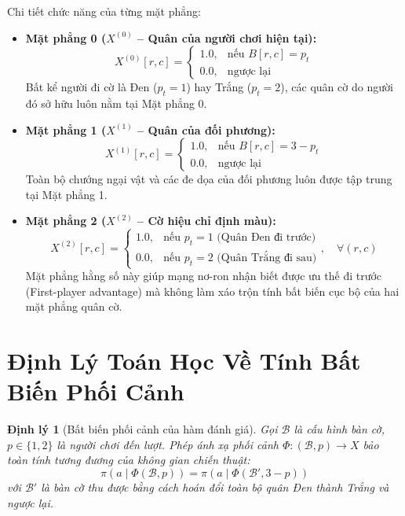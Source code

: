 \documentclass[11pt,a4paper]{report}
\newtheorem{theorem}{Định lý}[chapter]
\begin{document}
Chi tiết chức năng của từng mặt phẳng:
\begin{itemize}
    \item \textbf{Mặt phẳng 0 ($X^{(0)}$ -- Quân của người chơi hiện tại):}
    \begin{equation}
        X^{(0)}[r, c] = \begin{cases} 1.0, & \text{nếu } B[r, c] = p_t \\ 0.0, & \text{ngược lại} \end{cases}
    \end{equation}
    Bất kể người đi cờ là Đen ($p_t = 1$) hay Trắng ($p_t = 2$), các quân cờ do người đó sở hữu luôn nằm tại Mặt phẳng 0.
    \item \textbf{Mặt phẳng 1 ($X^{(1)}$ -- Quân của đối phương):}
    \begin{equation}
        X^{(1)}[r, c] = \begin{cases} 1.0, & \text{nếu } B[r, c] = 3 - p_t \\ 0.0, & \text{ngược lại} \end{cases}
    \end{equation}
    Toàn bộ chướng ngại vật và các đe dọa của đối phương luôn được tập trung tại Mặt phẳng 1.
    \item \textbf{Mặt phẳng 2 ($X^{(2)}$ -- Cờ hiệu chỉ định màu):}
    \begin{equation}
        X^{(2)}[r, c] = \begin{cases} 1.0, & \text{nếu } p_t = 1 \text{ (Quân Đen đi trước)} \\ 0.0, & \text{nếu } p_t = 2 \text{ (Quân Trắng đi sau)} \end{cases}, \quad \forall (r, c)
    \end{equation}
    Mặt phẳng hằng số này giúp mạng nơ-ron nhận biết được ưu thế đi trước (First-player advantage) mà không làm xáo trộn tính bất biến cục bộ của hai mặt phẳng quân cờ.
\end{itemize}

\section{Định Lý Toán Học Về Tính Bất Biến Phối Cảnh}

\begin{theorem}[Bất biến phối cảnh của hàm đánh giá]
Gọi $\mathcal{B}$ là cấu hình bàn cờ, $p \in \{1, 2\}$ là người chơi đến lượt. Phép ánh xạ phối cảnh $\Phi: (\mathcal{B}, p) \to X$ bảo toàn tính tương đương của không gian chiến thuật:
\begin{equation}
    \pi(a \mid \Phi(\mathcal{B}, p)) = \pi(a \mid \Phi(\mathcal{B}', 3 - p))
\end{equation}
với $\mathcal{B}'$ là bàn cờ thu được bằng cách hoán đổi toàn bộ quân Đen thành Trắng và ngược lại.
\end{theorem}
\end{document}
